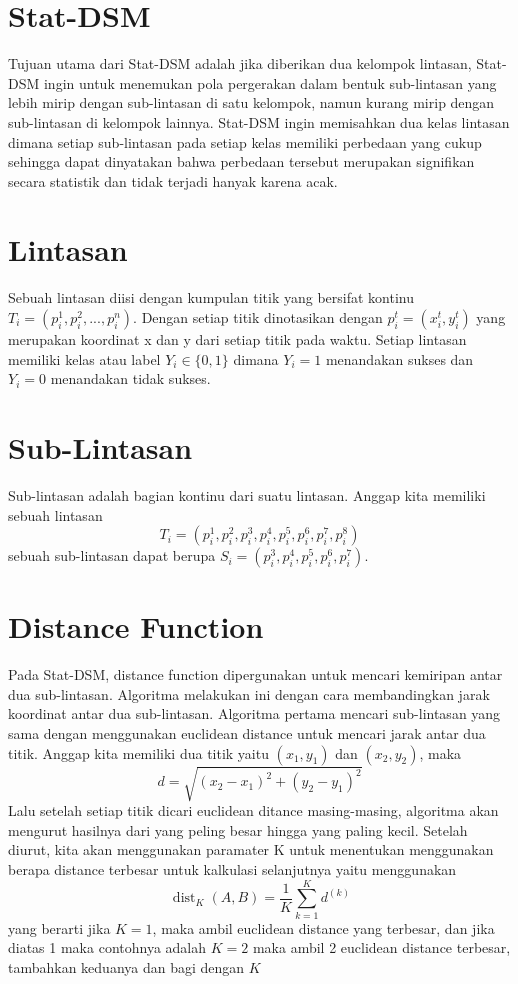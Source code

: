 \documentclass[a4paper,twoside]{article}
\begin{document}
\section{Stat-DSM}
Tujuan utama dari Stat-DSM adalah jika diberikan dua kelompok lintasan, Stat-DSM ingin untuk menemukan pola pergerakan dalam bentuk sub-lintasan yang lebih mirip dengan sub-lintasan di satu kelompok, namun kurang mirip dengan sub-lintasan di kelompok lainnya.
Stat-DSM ingin memisahkan dua kelas lintasan dimana setiap sub-lintasan pada setiap kelas memiliki perbedaan yang cukup sehingga dapat dinyatakan bahwa perbedaan tersebut merupakan signifikan secara statistik dan tidak terjadi hanyak karena acak.

\section{Lintasan}
Sebuah lintasan diisi dengan kumpulan titik yang bersifat kontinu $T_i = (p_i^1,p_i^2,...,p_i^n)$.
Dengan setiap titik dinotasikan dengan $p_i^t = (x_i^t,y_i^t)$ yang merupakan koordinat x dan y dari setiap titik pada waktu.
Setiap lintasan memiliki kelas atau label $Y_i\in\{0,1\}$ dimana $Y_i = 1$ menandakan sukses dan $Y_i = 0$ menandakan tidak sukses.

\section{Sub-Lintasan}
Sub-lintasan adalah bagian kontinu dari suatu lintasan.
Anggap kita memiliki sebuah lintasan \[T_i = (p_i^1,p_i^2,p_i^3,p_i^4,p_i^5,p_i^6,p_i^7,p_i^8)\]sebuah sub-lintasan dapat berupa $S_i = (p_i^3,p_i^4,p_i^5,p_i^6,p_i^7)$.

\section{Distance Function}
Pada Stat-DSM, distance function dipergunakan untuk mencari kemiripan antar dua sub-lintasan. 
Algoritma melakukan ini dengan cara membandingkan jarak koordinat antar dua sub-lintasan.
Algoritma pertama mencari sub-lintasan yang sama dengan menggunakan euclidean distance untuk mencari jarak antar dua titik.
Anggap kita memiliki dua titik yaitu $(x_1, y_1)$ dan $(x_2, y_2)$, maka \[ d = \sqrt{(x_2 - x_1)^2 + (y_2 - y_1)^2} \]
Lalu setelah setiap titik dicari euclidean ditance masing-masing, algoritma akan mengurut hasilnya dari yang peling besar hingga yang paling kecil.
Setelah diurut, kita akan menggunakan paramater K untuk menentukan menggunakan berapa distance terbesar untuk kalkulasi selanjutnya yaitu menggunakan \[ \operatorname{dist}_K(A,B)=\frac{1}{K}\sum_{k=1}^{K}d^{(k)} \] yang berarti jika $K = 1$, maka ambil euclidean distance yang terbesar, dan jika diatas 1 maka contohnya adalah $K = 2$ maka ambil 2 euclidean distance terbesar, tambahkan keduanya dan bagi dengan $K$
\end{document}
